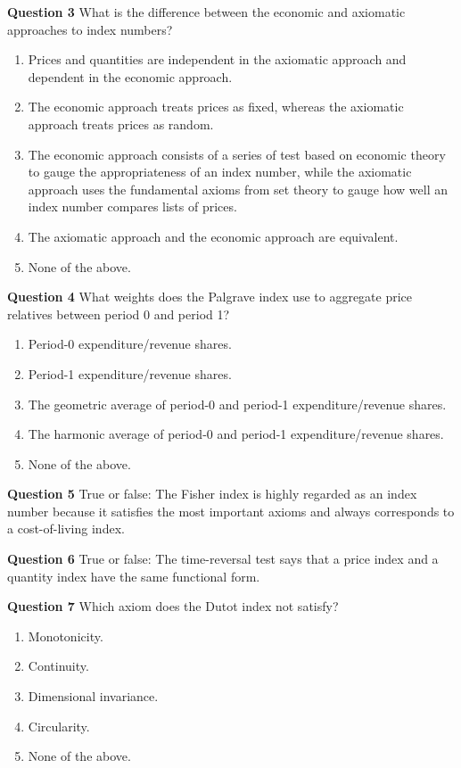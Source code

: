 \documentclass[]{article}
\begin{document}
\textbf{Question 3} What is the difference between the economic and axiomatic approaches to index numbers?

\begin{enumerate}
\def\labelenumi{\alph{enumi})}
\item
  Prices and quantities are independent in the axiomatic approach and dependent in the economic approach.
\item
  The economic approach treats prices as fixed, whereas the axiomatic approach treats prices as random.
\item
  The economic approach consists of a series of test based on economic theory to gauge the appropriateness of an index number, while the axiomatic approach uses the fundamental axioms from set theory to gauge how well an index number compares lists of prices.
\item
  The axiomatic approach and the economic approach are equivalent.
\item
  None of the above.
\end{enumerate}

\textbf{Question 4} What weights does the Palgrave index use to aggregate price relatives between period 0 and period 1?

\begin{enumerate}
\def\labelenumi{\alph{enumi})}
\item
  Period-0 expenditure/revenue shares.
\item
  Period-1 expenditure/revenue shares.
\item
  The geometric average of period-0 and period-1 expenditure/revenue shares.
\item
  The harmonic average of period-0 and period-1 expenditure/revenue shares.
\item
  None of the above.
\end{enumerate}

\textbf{Question 5} True or false: The Fisher index is highly regarded as an index number because it satisfies the most important axioms and always corresponds to a cost-of-living index.

\textbf{Question 6} True or false: The time-reversal test says that a price index and a quantity index have the same functional form.

\textbf{Question 7} Which axiom does the Dutot index not satisfy?

\begin{enumerate}
\def\labelenumi{\alph{enumi})}
\item
  Monotonicity.
\item
  Continuity.
\item
  Dimensional invariance.
\item
  Circularity.
\item
  None of the above.
\end{enumerate}
\end{document}
